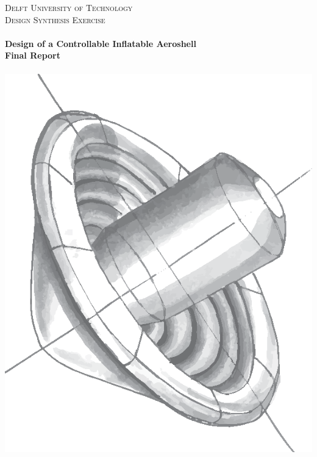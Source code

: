 \begin{titlepage}
\begin{center}

\textsc{\LARGE Delft University of Technology}\\[0.3cm]
\textsc{\Large Design Synthesis Exercise}\\[0.5cm]

\HRule \\[0.4cm]
{\Large \bfseries Design of a Controllable Inflatable Aeroshell}\\[0.2cm]
{\Huge \bfseries Final Report}\\[0.2cm]
\HRule \\[0.5cm]

\includegraphics[scale=1.10]{./Titlepage/stacked_toroid}\\[0.5cm]



\end{center}
\end{titlepage}
